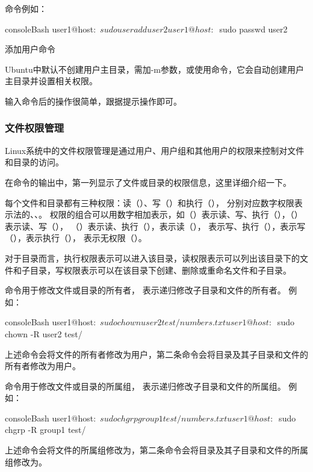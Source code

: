 命令例如：
\begin{envcode}{console}{Bash}
user1@host:~$ sudo useradd user2
user1@host:~$ sudo passwd user2
\end{envcode}

\begin{zy}
添加用户命令

Ubuntu中默认不创建用户主目录，需加-m参数，或使用命令，它会自动创建用户主目录并设置相关权限。
\end{zy}

输入命令后的操作很简单，跟据提示操作即可。

\subsubsection{文件权限管理}
Linux系统中的文件权限管理是通过用户、用户组和其他用户的权限来控制对文件和目录的访问。

在命令的输出中，第一列显示了文件或目录的权限信息，这里详细介绍一下。

每个文件和目录都有三种权限：读（）、写（）和执行（），
分别对应数字权限表示法的、、。
权限的组合可以用数字相加表示，如（）表示读、写、执行（），（）表示读、写（），
（）表示读、执行（），表示读（），
表示写、执行（），表示写（），表示执行（），
表示无权限（\code{---}）。

对于目录而言，执行权限表示可以进入该目录，读权限表示可以列出该目录下的文件和子目录，写权限表示可以在该目录下创建、删除或重命名文件和子目录。

命令用于修改文件或目录的所有者， 表示递归修改子目录和文件的所有者。
例如：
\begin{envcode}{console}{Bash}
user1@host:~$ sudo chown user2 test/numbers.txt
user1@host:~$ sudo chown -R user2 test/
\end{envcode}
上述命令会将文件的所有者修改为用户，第二条命令会将目录及其子目录和文件的所有者修改为用户。

命令用于修改文件或目录的所属组， 表示递归修改子目录和文件的所属组。
例如：
\begin{envcode}{console}{Bash}
user1@host:~$ sudo chgrp group1 test/numbers.txt
user1@host:~$ sudo chgrp -R group1 test/
\end{envcode}
上述命令会将文件的所属组修改为，第二条命令会将目录及其子目录和文件的所属组修改为。

